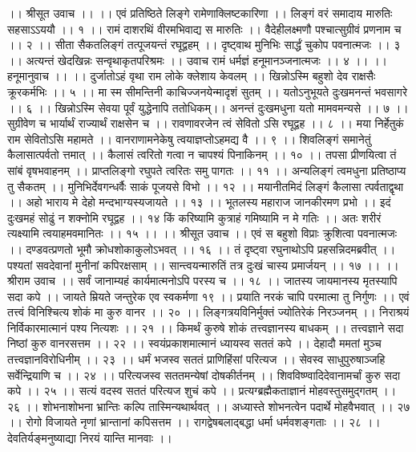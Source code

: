।। श्रीसूत उवाच ।। ।।
एवं प्रतिष्ठिते लिङ्गे रामेणाक्लिष्टकारिणा ।।
लिङ्गं वरं समादाय मारुतिः सहसाऽऽययौ ।। १ ।।
रामं दाशरथिं वीरमभिवाद्य स मारुतिः ।।
वैदेहीलक्ष्मणौ पश्चात्सुग्रीवं प्रणनाम च ।। २ ।।
सीता सैकतलिङ्गं तत्पूजयन्तं रघूद्वहम् ।।
दृष्ट्वाथ मुनिभिः सार्द्धं चुकोप पवनात्मजः ।। ३ ।।
अत्यन्तं खेदखिन्नः सन्वृथाकृतपरिश्रमः ।।
उवाच रामं धर्मज्ञं हनूमानञ्जनात्मजः ।। ४ ।।
।। हनूमानुवाच ।। ।।
दुर्जातोऽहं वृथा राम लोके क्लेशाय केवलम् ।।
खिन्नोऽस्मि बहुशो देव राक्षसैः क्रूरकर्मभिः ।। ५ ।।
मा स्म सीमन्तिनी काचिज्जनयेन्मादृशं सुतम् ।।
यतोऽनुभूयते दुःखमनन्तं भवसागरे ।। ६ ।।
खिन्नोऽस्मि सेवया पूर्वं युद्धेनापि ततोधिकम्।।
अनन्तं दुःखमधुना यतो मामवमन्यसे ।। ७ ।।
सुग्रीवेण च भार्यार्थं राज्यार्थं राक्षसेन च ।।
रावणावरजेन त्वं सेवितो ऽसि रघूद्वह ।। ८ ।।
मया निर्हेतुकं राम सेवितोऽसि महामते ।।
वानराणामनेकेषु त्वयाज्ञप्तोऽहमद्य वै ।। ९ ।।
शिवलिङ्गं समानेतुं कैलासात्पर्वतो त्तमात् ।।
कैलासं त्वरितो गत्वा न चापश्यं पिनाकिनम् ।। १० ।।
तपसा प्रीणयित्वा तं सांबं वृषभवाहनम् ।।
प्राप्तलिङ्गो रघुपते त्वरितः समु पागतः ।। ११ ।।
अन्यलिङ्गं त्वमधुना प्रतिष्ठाप्य तु सैकतम् ।।
मुनिभिर्देवगन्धर्वैः साकं पूजयसे विभो ।। १२ ।।
मयानीतमिदं लिङ्गं कैलासा त्पर्वताद्वृथा ।।
अहो भाराय मे देहो मन्दभाग्यस्यजायते ।। १३ ।।
भूतलस्य महाराज जानकीरमण प्रभो ।।
इदं दुःखमहं सोढुं न शक्नोमि रघूद्वह ।। १४
किं करिष्यामि कुत्राहं गमिष्यामि न मे गतिः ।।
अतः शरीरं त्यक्ष्यामि त्वयाहमवमानितः ।। १५ ।।
।। श्रीसूत उवाच ।।
एवं स बहुशो विप्राः क्रुशित्वा पवनात्मजः ।।
दण्डवत्प्रणतो भूमौ क्रोधशोकाकुलोऽभवत् ।। १६ ।।
तं दृष्ट्वा रघुनाथोऽपि प्रहसन्निदमब्रवीत् ।।
पश्यतां सवदेवानां मुनीनां कपिरक्षसाम् ।।
सान्त्वयन्मारुतिं तत्र दुःखं चास्य प्रमार्जयन् ।। १७ ।।
।। श्रीराम उवाच ।।
सर्वं जानाम्यहं कार्यमात्मनोऽपि परस्य च ।। १८ ।।
जातस्य जायमानस्य मृतस्यापि सदा कपे ।।
जायते म्रियते जन्तुरेक एव स्वकर्मणा १९ ।।
प्रयाति नरकं चापि परमात्मा तु निर्गुणः ।।
एवं तत्त्वं विनिश्चित्य शोकं मा कुरु वानर ।। २० ।।
लिङ्गत्रयविनिर्मुक्तं ज्योतिरेकं निरञ्जनम् ।।
निराश्रयं निर्विकारमात्मानं पश्य नित्यशः ।। २१ ।।
किमर्थं कुरुषे शोकं तत्त्वज्ञानस्य बाधकम् ।।
तत्त्वज्ञाने सदा निष्ठां कुरु वानरसत्तम ।। २२ ।।
स्वयंप्रकाशमात्मानं ध्यायस्व सततं कपे ।।
देहादौ ममतां मुञ्च तत्त्वज्ञानविरोधिनीम् ।। २३ ।।
धर्मं भजस्व सततं प्राणिहिंसां परित्यज ।।
सेवस्व साधुपुरुषाञ्जहि सर्वेन्द्रियाणि च ।। २४ ।।
परित्यजस्व सततमन्येषां दोषकीर्तनम् ।।
शिवविष्ण्वादिदेवानामर्चां कुरु सदा कपे ।। २५ ।।
सत्यं वदस्व सततं परित्यज शुचं कपे ।।
प्रत्यग्ब्रह्मैकताज्ञानं मोहवस्तुसमुद्गतम् ।। २६ ।।
शोभनाशोभना भ्रान्तिः कल्पि तास्मिन्यथार्थवत् ।।
अध्यास्ते शोभनत्वेन पदार्थे मोहवैभवात् ।। २७ ।।
रोगो विजायते नृणां भ्रान्तानां कपिसत्तम ।।
रागद्वेषबलाद्बद्धा धर्मा धर्मवशङ्गताः ।। २८ ।।
देवतिर्यङ्मनुष्याद्या निरयं यान्ति मानवाः ।।
